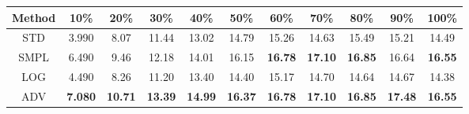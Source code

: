 \documentclass{standalone}
\begin{document}
\begin{tabular}{c|cccccccccc}
      \toprule
      Method & 10\% & 20\% & 30\% & 40\% & 50\% & 60\% & 70\% & 80\% & 90\% & 100\% \\
      \midrule
STD & 3.990 & 8.07 & 11.44 & 13.02 & 14.79 & 15.26 & 14.63 & 15.49 & 15.21 & 14.49\\
SMPL & 6.490 & 9.46 & 12.18 & 14.01 & 16.15 & \textbf{16.78} & \textbf{17.10} & \textbf{16.85} & 16.64 & \textbf{16.55}\\
LOG & 4.490 & 8.26 & 11.20 & 13.40 & 14.40 & 15.17 & 14.70 & 14.64 & 14.67 & 14.38\\
ADV & \textbf{7.080} & \textbf{10.71} & \textbf{13.39} & \textbf{14.99} & \textbf{16.37} & \textbf{16.78} & \textbf{17.10} & \textbf{16.85} & \textbf{17.48} & \textbf{16.55}\\
  \bottomrule
\end{tabular}
\end{document}
